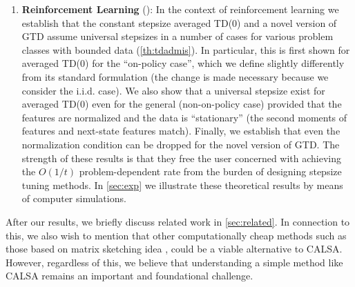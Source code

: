 \begin{enumerate}[topsep=0pt,itemsep=1pt,wide, labelwidth=!, labelindent=0pt,label=\emph{\arabic*}.]
\item \textbf{Reinforcement Learning} (): 
In the context of reinforcement learning we establish that the constant stepsize averaged TD($0$) 
and a novel version of GTD assume universal stepsizes in a number of cases 
for various problem classes with bounded data (\cref{th:tdadmis}).
In particular, this is first shown for averaged TD($0$) for the ``on-policy case'', which we define
slightly differently from its standard formulation (the change is made necessary because we consider the i.i.d. case). 
We also show that a universal stepsize exist for averaged TD($0$) 
even for the general (non-on-policy case) provided that 
the features are normalized and the data is ``stationary'' (the second moments of features and next-state features match).
Finally, we establish that even the normalization condition can be dropped for the novel version of GTD. The strength of these results is that they free the user 
concerned with achieving the $O(1/t)$ problem-dependent rate from the burden of 
designing stepsize tuning methods.
In \cref{sec:exp} we illustrate these theoretical results by means of computer simulations.
\end{enumerate}%
After our results, we briefly discuss related work in \cref{sec:related}.
In connection to this, we also wish to mention
that other computationally cheap methods such as those based on matrix sketching idea \cite{woodruff2014sketching}, could be a viable alternative to  CALSA.  
However, regardless of this, we believe that understanding a simple method like CALSA remains an important and foundational challenge.

